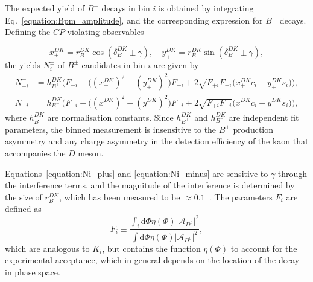 \documentclass[12pt, a4paper, notitlepage, onecolumn]{article}
\newcommand*{\diff}{\mathrm{d}}
\begin{document}
The expected yield of $B^-$ decays in bin $i$ is obtained by integrating Eq.~\eqref{equation:Bpm_amplitude}, and the corresponding expression for $B^+$ decays. Defining the $C\!P$-violating observables

\begin{equation}
    x_\pm^{DK} = r_B^{DK}\cos(\delta_B^{DK}\pm\gamma), \quad y_\pm^{DK} = r_B^{DK}\sin(\delta_B^{DK}\pm\gamma),
    \label{equation:CP_observables}
\end{equation}
the yields $N_i^\pm$ of $B^\pm$ candidates in bin $i$ are given by 
\begin{align}
    N_{+i}^+ &= h_{B^+}^{DK}\Big(F_{-i} + \big((x_+^{DK})^2 + (y_+^{DK})^2\big)F_{+i} + 2\sqrt{F_{+i}F_{-i}}\big(x_+^{DK}c_i - y_+^{DK}s_i\big)\Big), \label{equation:Ni_plus} \\
    N_{-i}^- &= h_{B^-}^{DK}\Big(F_{-i} + \big((x_-^{DK})^2 + (y_-^{DK})^2\big)F_{+i} + 2\sqrt{F_{+i}F_{-i}}\big(x_-^{DK}c_i - y_-^{DK}s_i\big)\Big), \label{equation:Ni_minus}
\end{align}
where $h_{B^\pm}^{DK}$ are normalisation constants. Since $h_{B^+}^{DK}$ and $h_{B^-}^{DK}$ are independent fit parameters, the binned measurement is insensitive to the $B^\pm$ production asymmetry and any charge asymmetry in the detection efficiency of the kaon that accompanies the $D$ meson.

Equations~\eqref{equation:Ni_plus} and \eqref{equation:Ni_minus} are sensitive to $\gamma$ through the interference terms, and the magnitude of the interference is determined by the size of $r_B^{DK}$, which has been measured to be $\approx 0.1$~\cite{LHCb-PAPER-2021-033}. The parameters $F_i$ are defined as
\begin{equation}
    F_i\equiv\frac{\int_i\diff\Phi\eta(\Phi)\lvert\mathcal{A}_{D^0}\rvert^2}{\int\diff\Phi\eta(\Phi)\lvert\mathcal{A}_{D^0}\rvert^2},
    \label{equation:Fi}
\end{equation}
which are analogous to $K_i$, but contains the function $\eta(\Phi)$ to account for the experimental acceptance, which in general depends on the location of the decay in phase space.
\end{document}
